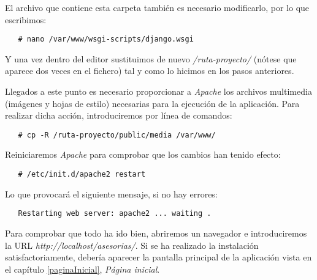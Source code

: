    El archivo que contiene esta carpeta también es necesario modificarlo, por
   lo que escribimos:

   \begin{verbatim}
   # nano /var/www/wsgi-scripts/django.wsgi
   \end{verbatim}

   Y una vez dentro del editor sustituimos de nuevo \textit{/ruta-proyecto/}
   (nótese que aparece dos veces en el fichero) tal y como lo hicimos en los
   pasos anteriores.

   Llegados a este punto es necesario proporcionar a \textit{Apache} los
   archivos multimedia (imágenes y hojas de estilo) necesarias para la ejecución
   de la aplicación. Para realizar dicha acción, introduciremos por línea de
   comandos:

   \begin{verbatim}
   # cp -R /ruta-proyecto/public/media /var/www/
   \end{verbatim}

   Reiniciaremos \textit{Apache} para comprobar que los cambios han tenido
   efecto:

   \begin{verbatim}
   # /etc/init.d/apache2 restart
   \end{verbatim}

   Lo que provocará el siguiente mensaje, si no hay errores:

   \begin{verbatim}
   Restarting web server: apache2 ... waiting .
   \end{verbatim}

   Para comprobar que todo ha ido bien, abriremos un navegador e introduciremos
   la URL \textit{http://localhost/asesorias/}. Si se ha realizado la
   instalación satisfactoriamente, debería aparecer la pantalla principal
   de la aplicación vista en el capítulo \ref{paginaInicial},
   \textit{Página inicial}.
